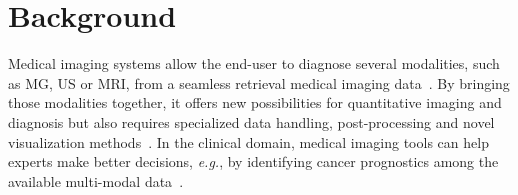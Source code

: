 \section{Background}
\label{sec:sec002}

Medical imaging systems allow the end-user to diagnose several modalities\footnotemark[1], such as MG, US or MRI, from a seamless retrieval medical imaging data~\cite{faraji2019radiologic}.
By bringing those modalities together, it offers new possibilities for quantitative imaging and diagnosis but also requires specialized data handling, post-processing and novel visualization methods~\cite{Igarashi:2016:IVS:2984511.2984537}.
In the clinical domain, medical imaging tools can help experts make better decisions, {\it e.g.}, by identifying cancer prognostics among the available multi-modal data~\cite{Lopes:2017:UHC:3143820.3144118}.

\cite{10.1145/3132272.3134111}

\cite{calisto2020breastscreening}

\break